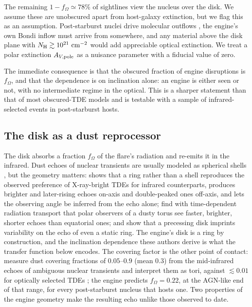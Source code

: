 \documentclass[twocolumn,pdftex]{aastex701}
\newcommand{\fom}{f_{\Omega}\xspace}
\begin{document}
The remaining $1 - \fom \simeq 78\%$ of sightlines view the nucleus over the disk. We assume these are unobscured apart from host-galaxy extinction, but we flag this as an assumption. Post-starburst nuclei drive molecular outflows \citep{Alatalo:2015a}, the engine's own Bondi inflow must arrive from somewhere, and any material above the disk plane with $N_{\rm H} \gtrsim 10^{21}~{\rm cm}^{-2}$ would add appreciable optical extinction. We treat a polar extinction $A_{V,{\rm pole}}$ as a nuisance parameter with a fiducial value of zero.

The immediate consequence is that the obscured fraction of engine disruptions is $\fom$, and that the dependence is on inclination alone: an engine is either seen or not, with no intermediate regime in the optical. This is a sharper statement than that of most obscured-TDE models and is testable with a sample of infrared-selected events in post-starburst hosts.

\subsection{The disk as a dust reprocessor}\label{subsec:echo}

The disk absorbs a fraction $\fom$ of the flare's radiation and re-emits it in the infrared. Dust echoes of nuclear transients are usually modeled as spherical shells \citep{Lu:2016a,vanVelzen:2016a}, but the geometry matters: \citet{Eyles-Ferris:2026a} shows that a ring rather than a shell reproduces the observed preference of X-ray-bright TDEs for infrared counterparts, produces brighter and later-rising echoes on-axis and double-peaked ones off-axis, and lets the observing angle be inferred from the echo alone; \citet{Tuna:2025a} find with time-dependent radiation transport that polar observers of a dusty torus see faster, brighter, shorter echoes than equatorial ones; and \citet{Wu:2026a} show that a precessing disk imprints variability on the echo of even a static ring. The engine's disk is a ring by construction, and the inclination dependence these authors derive is what the transfer function below encodes. The covering factor is the other point of contact: \citet{Hinkle:2024b} measure dust covering fractions of $0.05$--$0.9$ (mean $0.3$) from the mid-infrared echoes of ambiguous nuclear transients and interpret them as tori, against $\lesssim 0.01$ for optically selected TDEs \citep{Jiang:2021b}; the engine predicts $\fom = 0.22$, at the AGN-like end of that range, for every post-starburst nucleus that hosts one. Two properties of the engine geometry make the resulting echo unlike those observed to date.
\end{document}

